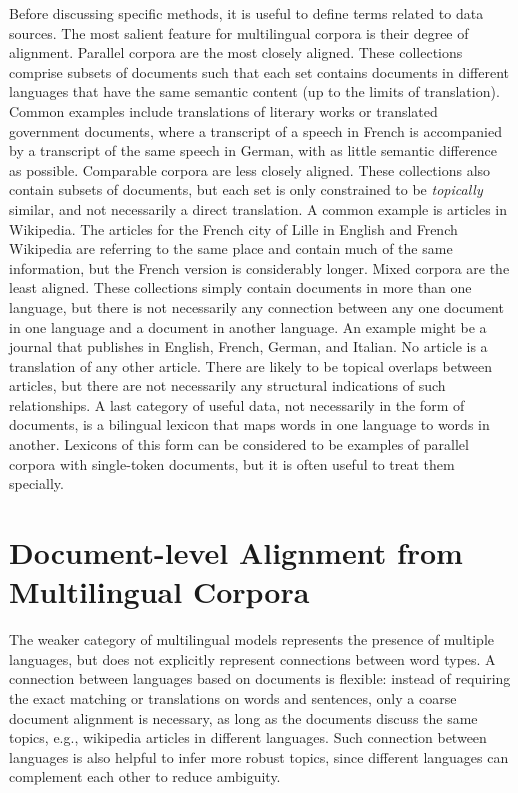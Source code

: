 Before discussing specific methods, it is useful to define terms related to data sources.
The most salient feature for multilingual corpora is their degree of alignment.
Parallel corpora are the most closely aligned. These collections comprise subsets of documents such that each set contains documents in different languages that have the same semantic content (up to the limits of translation).
Common examples include translations of literary works or translated government documents, where a transcript of a speech in French is accompanied by a transcript of the  same speech in German, with as little semantic difference as possible.
Comparable corpora are less closely aligned. 
These collections also contain subsets of documents, but each set is only constrained to be {\em topically} similar, and not necessarily a direct translation.
A common example is articles in Wikipedia.
The articles for the French city of Lille in English and French Wikipedia are referring to the same place and contain much of the same information, but the French version is considerably longer.
Mixed corpora are the least aligned. These collections simply contain documents in more than one language, but there is not necessarily any connection between any one document in one language and a document in another language.
An example might be a journal that publishes in English, French, German, and Italian.
No article is a translation of any other article.
There are likely to be topical overlaps between articles, but there are not necessarily any structural indications of such relationships.
A last category of useful data, not necessarily in the form of documents, is a bilingual lexicon that maps words in one language to words in another.
Lexicons of this form can be considered to be examples of parallel corpora with single-token documents, but it is often useful to treat them specially.

\section{Document-level Alignment from Multilingual Corpora}


The weaker category of multilingual models represents the presence of multiple languages, but does not explicitly represent connections between word types.
A connection between languages based on documents is flexible: instead of requiring
the exact matching or translations on words and sentences, only a
coarse document alignment is necessary, as long as the documents
discuss the same topics, e.g., wikipedia articles in different
languages. Such connection between languages is also helpful to infer
more robust topics, since different languages can complement each
other to reduce ambiguity.


